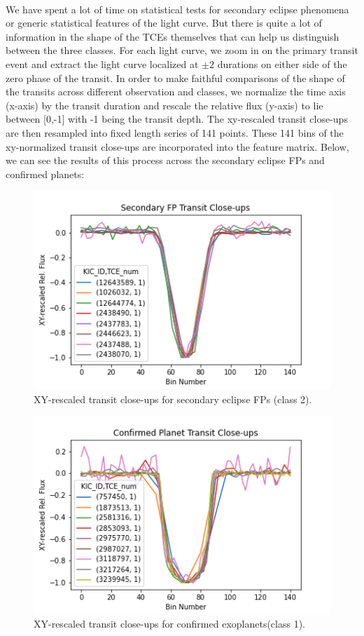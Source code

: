 \documentclass{article}
\begin{document}
\paragraph{}
We have spent a lot of time on statistical tests for secondary eclipse phenomena or generic statistical features of the light curve. But there is quite a lot of information in the shape of the TCEs themselves that can help us distinguish between the three classes. For each light curve, we zoom in on the primary transit event and extract the light curve localized at $\pm 2$ durations on either side of the zero phase of the transit. In order to make faithful comparisons of the shape of the transits across different observation and classes, we normalize the time axis (x-axis) by the transit duration and rescale the relative flux (y-axis) to lie between [0,-1] with -1 being the transit depth. The xy-rescaled transit close-ups are then resampled into fixed length series of 141 points. These 141 bins of the xy-normalized transit close-ups are incorporated into the feature matrix. Below, we can see the results of this process across the secondary eclipse FPs and confirmed planets:
 \begin{figure}[H]
	\begin{center}
		\includegraphics[totalheight=5cm]{figures/rescalexy_secondaryFP.png}
	\end{center}
	\caption{XY-rescaled transit close-ups for secondary eclipse FPs (class 2). }
\end{figure}
\begin{figure}[H]
	\begin{center}
		\includegraphics[totalheight=5cm]{figures/rescalexy_CP.png}
	\end{center}
	\caption{XY-rescaled transit close-ups for confirmed exoplanets(class 1).}
\end{figure}
\end{document}

